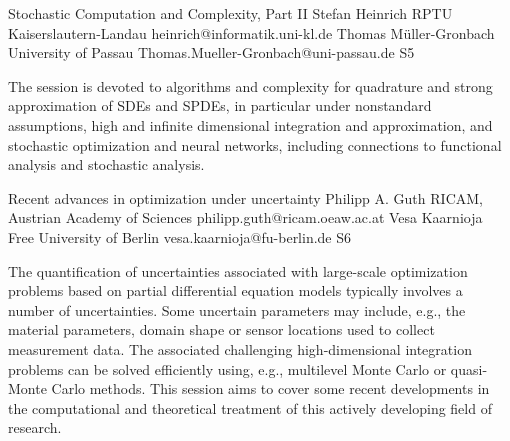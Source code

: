 \begin{session}
 {Stochastic Computation and Complexity, Part II}%
 {Stefan Heinrich}%
 {RPTU Kaiserslautern-Landau}%
 {heinrich@informatik.uni-kl.de}%
 {Thomas M\"uller-Gronbach}%
 {University of Passau}%
 {Thomas.Mueller-Gronbach@uni-passau.de}%
 {S5}%
 {}%

 The session is devoted to algorithms and complexity for
 quadrature and strong approximation of SDEs and SPDEs, in particular under nonstandard assumptions,
 high and infinite dimensional integration and approximation, and
 stochastic optimization and neural networks,
 including connections to functional analysis and stochastic analysis.
 \medskip
\end{session}



\clearpage

\begin{session}
 {Recent advances in optimization under uncertainty}%
 {Philipp A. Guth}%
 {RICAM, Austrian Academy of Sciences}%
 {philipp.guth@ricam.oeaw.ac.at}%
 {Vesa Kaarnioja}%
 {Free University of Berlin}%
 {vesa.kaarnioja@fu-berlin.de}%
 {S6}%
{}

 The quantification of uncertainties associated with large-scale optimization problems based on partial differential equation models typically involves a number of uncertainties. Some uncertain parameters may include, e.g., the material parameters, domain shape or sensor locations used to collect measurement data. The associated challenging high-dimensional integration problems can be solved efficiently using, e.g., multilevel Monte Carlo or quasi-Monte Carlo methods. This session aims to cover some recent developments in the computational and theoretical treatment of this actively developing field of research.
\end{session}

